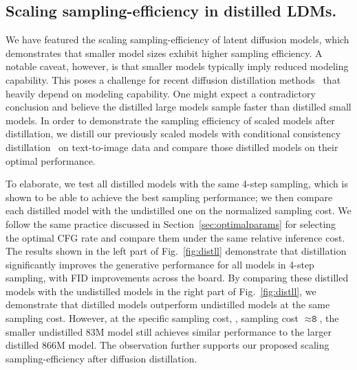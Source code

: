\subsection{Scaling sampling-efficiency in distilled LDMs.}
\label{sec:scalingdistill}

We have featured the scaling sampling-efficiency of latent diffusion models, which demonstrates that smaller model sizes exhibit higher sampling efficiency.
A notable caveat, however, is that smaller models typically imply reduced modeling capability. This poses a challenge for recent diffusion distillation methods~\cite{luhman2021knowledge, salimans2022progressive, song2023consistency, sauer2023adversarial, gu2023boot, mei2023conditional,luo2023latent, lin2024sdxl} that heavily depend on modeling capability.
One might expect a contradictory conclusion and believe the distilled large models sample faster than distilled small models.
In order to demonstrate the sampling efficiency of scaled models after distillation, we distill our previously scaled models with conditional consistency distillation~\cite{song2023consistency, mei2023conditional} on text-to-image data and compare those distilled models on their optimal performance.

To elaborate, we test all distilled models with the same 4-step sampling, which is shown to be able to achieve the best sampling performance; we then compare each distilled model with the undistilled one on the normalized sampling cost.
We follow the same practice discussed in Section~\ref{sec:optimalparams} for selecting the optimal CFG rate and compare them under the same relative inference cost.
The results shown in the left part of Fig.~\ref{fig:distll} demonstrate that distillation significantly improves the generative performance for all models in 4-step sampling, with FID improvements across the board.
By comparing these distilled models with the undistilled models in the right part of Fig.~\ref{fig:distll}, we demonstrate that distilled models outperform undistilled models at the same sampling cost.
However, at the specific sampling cost, \ie, sampling cost $\approx \texttt{8}$, the smaller undistilled 83M model still achieves similar performance to the larger distilled 866M model.
%
The observation further supports our proposed scaling sampling-efficiency after diffusion distillation.


